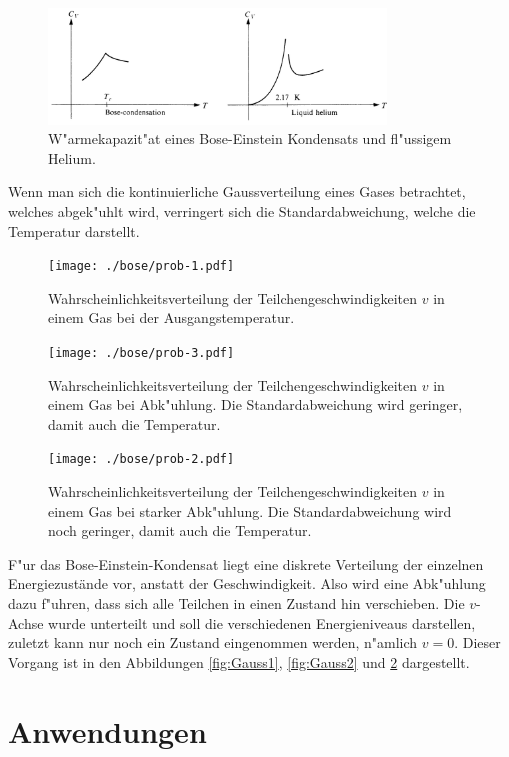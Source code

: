 \begin{refsection}
\begin{figure}
    \centering
    \includegraphics[width = 0.8\textwidth]{./bose/wrmkap.jpg}
    \caption[W"armekapazit"at eines Bose-Einstein Kondensats und fl"ussigem Helium.]{W"armekapazit"at eines Bose-Einstein Kondensats und fl"ussigem Helium. \cite{bose:feynman}}
    \label{fig:WrmKap}
\end{figure}
Wenn man sich die kontinuierliche Gaussverteilung eines Gases betrachtet, welches abgek"uhlt wird, verringert sich die Standardabweichung, welche die Temperatur darstellt.

\begin{figure}
    \centering
    \texttt{[image: ./bose/prob-1.pdf]}
    \caption[Verteilung Ausgangstemperatur]{Wahrscheinlichkeitsverteilung der Teilchengeschwindigkeiten $v$ in einem Gas bei der Ausgangstemperatur.}
    \label{fig:Gauss1}
    \texttt{[image: ./bose/prob-3.pdf]}
    \caption[Verteilung bei Abk"uhlung]{Wahrscheinlichkeitsverteilung der Teilchengeschwindigkeiten $v$ in einem Gas bei Abk"uhlung. Die Standardabweichung wird geringer, damit auch die Temperatur.}
	\label{fig:Gauss2}
    \texttt{[image: ./bose/prob-2.pdf]}
    \caption[Verteilung bei starker Abk"uhlung]{Wahrscheinlichkeitsverteilung der Teilchengeschwindigkeiten $v$  in einem Gas bei starker Abk"uhlung. Die Standardabweichung wird noch geringer, damit auch die Temperatur.}
	\label{fig:Gauss3}
\end{figure}
F"ur das Bose-Einstein-Kondensat liegt eine diskrete Verteilung der einzelnen Energiezustände vor, anstatt der Geschwindigkeit.
Also wird eine Abk"uhlung dazu f"uhren, dass sich alle Teilchen in einen Zustand hin verschieben. Die $v$-Achse wurde unterteilt und soll die verschiedenen Energieniveaus darstellen, zuletzt kann nur noch ein Zustand eingenommen werden, n"amlich $v = 0$. Dieser Vorgang ist in den Abbildungen \ref{fig:Gauss1}, \ref{fig:Gauss2} und \ref{fig:Gauss3} dargestellt.

\section{Anwendungen}

\end{refsection}
